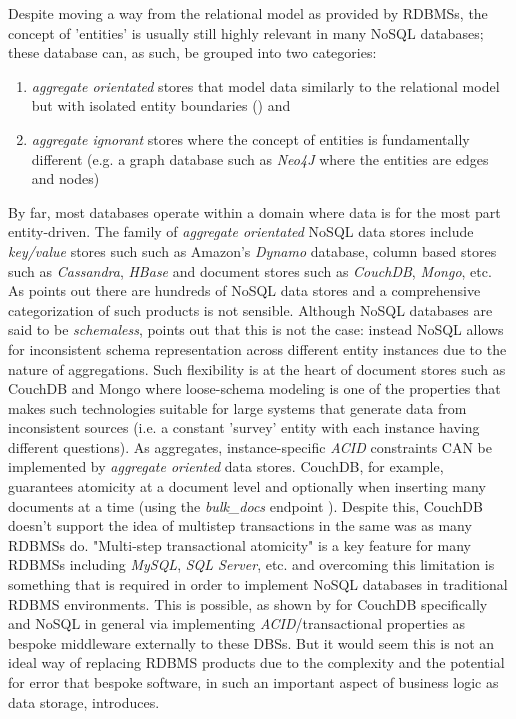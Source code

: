 Despite moving a way from the relational model as provided by RDBMSs, the concept of 'entities' is usually still highly relevant in many NoSQL databases; these database can, as such, be grouped into two categories:

\begin{enumerate}
    \item \textit{aggregate orientated} stores that model data similarly to the relational model but with isolated entity boundaries (\cite{fowlerAggregate}) and
    \item \textit{aggregate ignorant} stores where the concept of entities is fundamentally different (e.g. a graph database such as \textit{Neo4J} where the entities are edges and nodes)
\end{enumerate}

By far, most databases operate within a domain where data is for the most part entity-driven. The family of \textit{aggregate orientated} NoSQL data stores include \textit{key/value} stores such such as Amazon's \textit{Dynamo} database, column based stores such as \textit{Cassandra}, \textit{HBase} and document stores such as \textit{CouchDB}, \textit{Mongo}, etc. As \cite{GANESHCHANDRA201513} points out there are hundreds of NoSQL data stores and a comprehensive categorization of such products is not sensible. Although NoSQL databases are said to be \textit{schemaless}, \cite{ATZENI2016} points out that this is not the case: instead NoSQL allows for inconsistent schema representation across different entity instances due to the nature of aggregations. Such flexibility is at the heart of document stores such as CouchDB and Mongo where loose-schema modeling is one of the properties that makes such technologies suitable for large systems that generate data from inconsistent sources (i.e. a constant 'survey' entity with each instance having different questions). As aggregates, instance-specific \textit{ACID} constraints CAN be implemented by \textit{aggregate oriented} data stores. CouchDB, for example, guarantees atomicity at a document level and optionally when inserting many documents at a time (using the \textit{bulk\_docs} endpoint \cite{bulkDocs}). Despite this, CouchDB doesn't support the idea of multistep transactions in the same was as many RDBMSs do. "Multi-step transactional atomicity" is a key feature for many RDBMSs including \textit{MySQL}, \textit{SQL Server}, etc. and overcoming this limitation is something that is required in order to implement NoSQL databases in traditional RDBMS environments. This is possible, as shown by \cite{Rashmi2017} for CouchDB specifically and NoSQL in general \cite{LOTFY2016133} via implementing \textit{ACID}/transactional properties as bespoke middleware externally to these DBSs. But it would seem this is not an ideal way of replacing RDBMS products due to the complexity and the potential for error that bespoke software, in such an important aspect of business logic as data storage, introduces.

